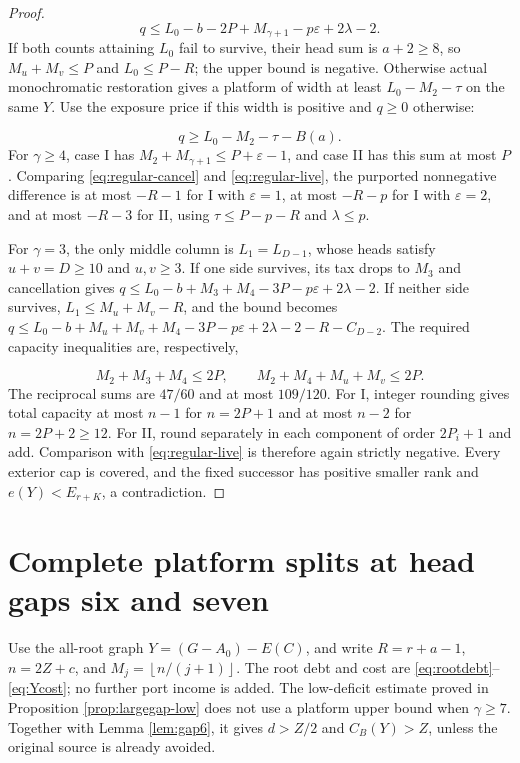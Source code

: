 \documentclass[11pt,a4paper]{article}
\newcommand{\floor}[1]{\left\lfloor#1\right\rfloor}
\theoremstyle{definition}
\begin{document}
\begin{proof}
\begin{equation}\label{eq:regular-cancel}
q\le L_0-b-2P+M_{\gamma+1}-p\varepsilon+2\lambda-2.
\end{equation}
If both counts attaining $L_0$ fail to survive, their head sum is
$a+2\ge8$, so $M_u+M_v\le P$ and $L_0\le P-R$;
the upper bound is negative.
Otherwise actual monochromatic restoration gives a platform
of width at least $L_0-M_2-\tau$ on the same $Y$.
Use the exposure price if this width is positive and $q\ge0$ otherwise:

\begin{equation}\label{eq:regular-live}
q\ge L_0-M_2-\tau-B(a).
\end{equation}
For $\gamma\ge4$, case I has $M_2+M_{\gamma+1}\le P+\varepsilon-1$,
and case II has this sum at most $P$.
Comparing \eqref{eq:regular-cancel} and \eqref{eq:regular-live},
the purported nonnegative difference is at most $-R-1$ for I with $\varepsilon=1$,
at most $-R-p$ for I with $\varepsilon=2$,
and at most $-R-3$ for II, using $\tau\le P-p-R$ and $\lambda\le p$.

For $\gamma=3$, the only middle column is $L_1=L_{D-1}$,
whose heads satisfy $u+v=D\ge10$ and $u,v\ge3$.
If one side survives, its tax drops to $M_3$ and cancellation gives
$q\le L_0-b+M_3+M_4-3P-p\varepsilon+2\lambda-2$.
If neither side survives, $L_1\le M_u+M_v-R$, and the bound becomes
$q\le L_0-b+M_u+M_v+M_4-3P-p\varepsilon+2\lambda-2-R-C_{D-2}$.
The required capacity inequalities are, respectively,

\[
M_2+M_3+M_4\le2P,\qquad M_2+M_4+M_u+M_v\le2P.
\]
The reciprocal sums are $47/60$ and at most $109/120$.
For I, integer rounding gives total capacity at most $n-1$ for
$n=2P+1$ and at most $n-2$ for $n=2P+2\ge12$.
For II, round separately in each component of order $2P_i+1$ and add.
Comparison with \eqref{eq:regular-live} is therefore again strictly negative.
Every exterior cap is covered, and the fixed successor has positive smaller rank
and $e(Y)<E_{r+K}$, a contradiction.
\end{proof}

\section{Complete platform splits at head gaps six and seven}\label{app:gaps67}
Use the all-root graph $Y=(G-A_0)-E(C)$, and write
$R=r+a-1$, $n=2Z+c$, and $M_j=\floor{n/(j+1)}$.
The root debt and cost are \eqref{eq:rootdebt}--\eqref{eq:Ycost};
no further port income is added.
The low-deficit estimate proved in Proposition \ref{prop:largegap-low}
does not use a platform upper bound when $\gamma\ge7$.
Together with Lemma \ref{lem:gap6}, it gives
$d>Z/2$ and $C_B(Y)>Z$, unless the original source is already avoided.
\end{document}
